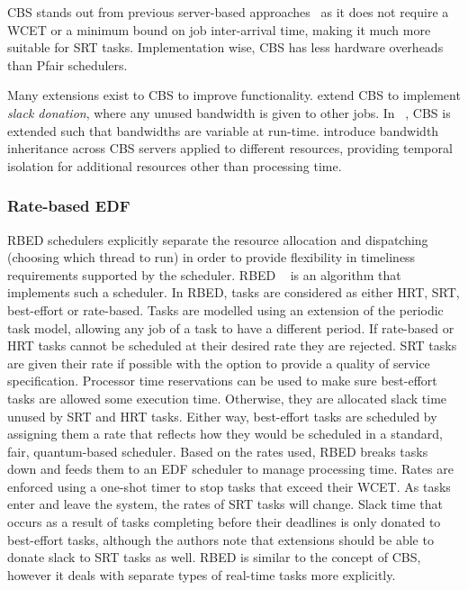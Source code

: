 \gls{CBS} stands out from previous server-based approaches~\citep{Spuri_Buttazzo_96,
Ghazalie_Baker_95, Spuri_Buttazzo_94, Deng_Liu_97} as it does not require a \gls{WCET} or a minimum
bound on job inter-arrival time, making it much more suitable for \gls{SRT} tasks.  Implementation
wise, \gls{CBS} has less hardware overheads than Pfair schedulers.

Many extensions exist to \gls{CBS} to improve functionality.  \citet{Kato_IR_11} extend \gls{CBS} to
implement \emph{slack donation}, where any unused bandwidth is given to other jobs.  In
~\citep{Craciunas_KPRS_12}, \gls{CBS} is extended such that bandwidths are variable at run-time.
\citet{Lamastra_LA_01} introduce bandwidth inheritance across CBS servers applied to different
resources, providing temporal isolation for additional resources other than processing time.

\subsubsection{Rate-based EDF}

\Gls{RBED} schedulers explicitly separate the resource allocation and dispatching
(choosing which thread to run) in order to provide flexibility in timeliness requirements supported
by the scheduler.  \Gls{RBED} ~\citep{Brandt_BLB_03} is an algorithm that implements such a
scheduler.  In \gls{RBED}, tasks are considered as either \gls{HRT}, \gls{SRT}, best-effort or
rate-based.  Tasks are modelled using an extension of the periodic task model, allowing any job of a
task to have a different period.  If rate-based or \gls{HRT} tasks cannot be scheduled at their
desired rate they are rejected.  \gls{SRT} tasks are given their rate if possible with the option to
provide a quality of service specification.  Processor time reservations can be used to make sure
best-effort tasks are allowed some execution time.  Otherwise, they are allocated slack time unused
by SRT and HRT tasks.  Either way, best-effort tasks are scheduled by assigning them a rate that
reflects how they would be scheduled in a standard, fair, quantum-based scheduler.  Based on the
rates used, \gls{RBED} breaks tasks down and feeds them to an \gls{EDF} scheduler to manage
processing time.  Rates are enforced using a one-shot timer to stop tasks that exceed their
{\gls{WCET}}.  As tasks enter and leave the system, the rates of \gls{SRT} tasks will change.  Slack
time that occurs as a result of tasks completing before their deadlines is only donated to 
best-effort tasks, although the authors note that extensions should be able to donate slack to \gls{SRT}
tasks as well.  \Gls{RBED} is similar to the concept of CBS, however it deals with separate types of
real-time tasks more explicitly.

